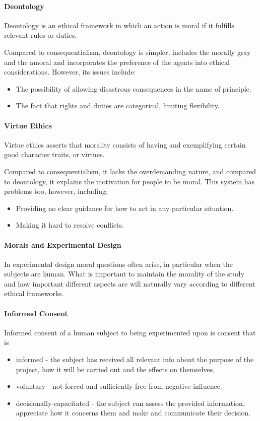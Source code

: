 \paragraph{Deontology}
Deontology is an ethical framework in which an action is moral if it fulfills relevant rules or duties.

Compared to consequentialism, deontology is simpler, includes the morally gray and the amoral and incorporates the preference of the agents into ethical considerations. However, its issues include:
\begin{itemize}
	\item The possibility of allowing disastrous consequences in the name of principle.
	\item The fact that rights and duties are categorical, limiting flexibility.
\end{itemize}

\paragraph{Virtue Ethics}
Virtue ethics asserts that morality consists of having and exemplifying certain good character traits, or virtues.

Compared to consequentialism, it lacks the overdemanding nature, and compared to deontology, it explains the motivation for people to be moral. This system has problems too, however, including:
\begin{itemize}
	\item Providing no clear guidance for how to act in any particular situation.
	\item Making it hard to resolve conflicts.
\end{itemize}

\paragraph{Morals and Experimental Design}
In experimental design moral questions often arise, in particular when the subjects are human. What is important to maintain the morality of the study and how important different aspects are will naturally vary according to different ethical frameworks.

\paragraph{Informed Consent}
Informed consent of a human subject to being experimented upon is consent that is
\begin{itemize}
	\item informed - the subject has received all relevant info about the purpose of the project, how it will be carried out and the effects on themselves.
	\item voluntary - not forced and sufficiently free from negative influence.
	\item decisionally-capacitated - the subject can assess the provided information, appreciate how it concerns them and make and communicate their decision.
\end{itemize}

